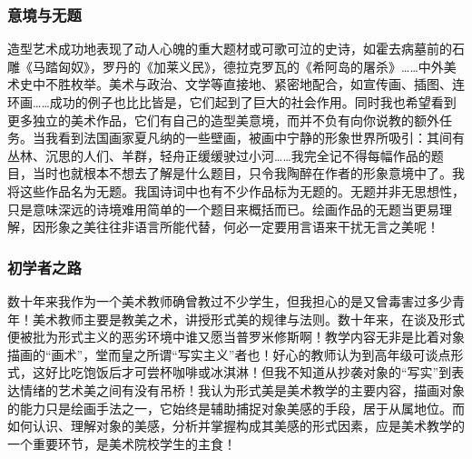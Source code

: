 \documentclass{article}
\begin{document}
\subsubsection{意境与无题}
造型艺术成功地表现了动人心魄的重大题材或可歌可泣的史诗，如霍去病墓前的石雕《马踏匈奴》，罗丹的《加莱义民》，德拉克罗瓦的《希阿岛的屠杀》……中外美术史中不胜枚举。美术与政治、文学等直接地、紧密地配合，如宣传画、插图、连环画……成功的例子也比比皆是，它们起到了巨大的社会作用。同时我也希望看到更多独立的美术作品，它们有自己的造型美意境，而并不负有向你说教的额外任务。当我看到法国画家夏凡纳的一些壁画，被画中宁静的形象世界所吸引：其间有丛林、沉思的人们、羊群，轻舟正缓缓驶过小河……我完全记不得每幅作品的题目，当时也就根本不想去了解是什么题目，只令我陶醉在作者的形象意境中了。我将这些作品名为无题。我国诗词中也有不少作品标为无题的。无题并非无思想性，只是意味深远的诗境难用简单的一个题目来概括而已。绘画作品的无题当更易理解，因形象之美往往非语言所能代替，何必一定要用言语来干扰无言之美呢！
\subsubsection{初学者之路}
数十年来我作为一个美术教师确曾教过不少学生，但我担心的是又曾毒害过多少青年！美术教师主要是教美之术，讲授形式美的规律与法则。数十年来，在谈及形式便被批为形式主义的恶劣环境中谁又愿当普罗米修斯啊！教学内容无非是比着对象描画的“画术”，堂而皇之所谓“写实主义”者也！好心的教师认为到高年级可谈点形式，这好比吃饱饭后才可尝杯咖啡或冰淇淋！但我不知道从抄袭对象的“写实”到表达情绪的艺术美之间有没有吊桥！我认为形式美是美术教学的主要内容，描画对象的能力只是绘画手法之一，它始终是辅助捕捉对象美感的手段，居于从属地位。而如何认识、理解对象的美感，分析并掌握构成其美感的形式因素，应是美术教学的一个重要环节，是美术院校学生的主食！
\end{document}
